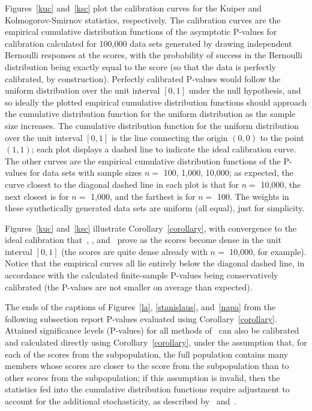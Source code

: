 \documentclass[12pt]{article}
\begin{document}
Figures~\ref{kuc} and~\ref{ksc} plot the calibration curves
for the Kuiper and Kolmogorov-Smirnov statistics, respectively.
The calibration curves are the empirical cumulative distribution functions
of the asymptotic P-values for calibration calculated
for 100,000 data sets generated
by drawing independent Bernoulli responses at the scores,
with the probability of success in the Bernoulli distribution
being exactly equal to the score (so that the data is perfectly calibrated,
by construction). Perfectly calibrated P-values would follow
the uniform distribution over the unit interval $[0, 1]$
under the null hypothesis, and so ideally the plotted
empirical cumulative distribution functions should approach
the cumulative distribution function for the uniform distribution
as the sample size increases. The cumulative distribution function
for the uniform distribution over the unit interval $[0, 1]$
is the line connecting the origin $(0, 0)$ to the point $(1, 1)$;
each plot displays a dashed line to indicate the ideal calibration curve.
The other curves are the empirical cumulative distribution functions
of the P-values for data sets with sample sizes $n =$ 100, 1,000, 10,000;
as expected, the curve closest to the diagonal dashed line in each plot 
is that for $n =$ 10,000, the next closest is for $n =$ 1,000,
and the farthest is for $n =$ 100.
The weights in these synthetically generated data sets are uniform (all equal),
just for simplicity.

Figures~\ref{kuc} and~\ref{ksc} illustrate Corollary~\ref{corollary},
with convergence to the ideal calibration
that~\citet{delgado}, \citet{diebolt}, and~\citet{stute}
prove as the scores become dense in the unit interval $[0, 1]$
(the scores are quite dense already with $n =$ 10,000, for example).
Notice that the empirical curves all lie entirely below
the diagonal dashed line, in accordance
with the calculated finite-sample P-values being conservatively calibrated
(the P-values are not smaller on average than expected).

The ends of the captions of Figures~\ref{la}, \ref{stanislaus}, and~\ref{napa}
from the following subsection report P-values evaluated
using Corollary~\ref{corollary}.
Attained significance levels (P-values) for all methods of~\citet{tygert_full}
can also be calibrated and calculated directly using Corollary~\ref{corollary},
under the assumption that, for each of the scores from the subpopulation,
the full population contains many members whose scores are closer to the score
from the subpopulation than to other scores from the subpopulation;
if this assumption is invalid, then the statistics fed
into the cumulative distribution functions require adjustment
to account for the additional stochasticity,
as described by~\citet{tygert_full} and~\citet{tygert_two}.
\end{document}
